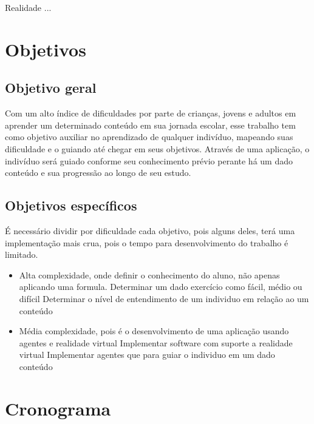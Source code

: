 \documentclass[12pt]{article}
\begin{document}
    Realidade ...

\newpage
\section{Objetivos}

\subsection{Objetivo geral}

   \hspace*{5mm}Com um alto índice de dificuldades por parte de crianças, jovens e adultos em
    aprender um determinado conteúdo em sua jornada escolar, esse trabalho tem como objetivo auxiliar no
    aprendizado de qualquer indivíduo, mapeando suas dificuldade e o guiando até chegar em seus
    objetivos. Através de uma aplicação, o indivíduo será guiado conforme seu conhecimento prévio
    perante há um dado conteúdo e sua progressão ao longo de seu estudo.

\subsection{Objetivos específicos}
    \hspace*{5mm}

    É necessário dividir por dificuldade cada objetivo, pois alguns deles, terá uma implementação
    mais crua, pois o tempo para desenvolvimento do trabalho é limitado.

    \begin{itemize}
        \item Alta complexidade, onde definir o conhecimento do aluno, não apenas aplicando uma formula.
        \subitem Determinar um dado exercício como fácil, médio ou difícil
        \subitem Determinar o nível de entendimento de um individuo em relação ao um conteúdo
        \item Média complexidade, pois é o desenvolvimento de uma aplicação usando agentes e realidade virtual
        \subitem Implementar software com suporte a realidade virtual
        \subitem Implementar agentes que para guiar o individuo em um dado conteúdo
    \end{itemize}

\newpage
\section{Cronograma}
\end{document}
